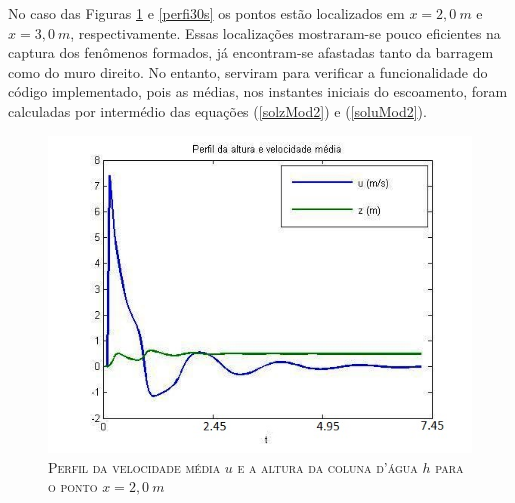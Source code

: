  No caso das Figuras \ref{perfi20s} e \ref{perfi30s} os pontos estão localizados em $x= 2,0 \ m$ e $x= 3,0 \ m$, respectivamente. Essas localizações mostraram-se pouco eficientes na captura dos fenômenos formados, já encontram-se afastadas tanto da barragem como do muro direito. No entanto, serviram para verificar a funcionalidade do código implementado, pois as médias, nos instantes iniciais do escoamento, foram calculadas por intermédio das equações (\ref{solzMod2}) e (\ref{soluMod2}).
 
 \begin{figure}[H]
 	\centering
 	\includegraphics[scale=1]{figuras/perfil20s.jpg}
 	\caption{\textsc{Perfil da velocidade média $u$ e a altura da coluna d'água $h$ para o ponto $x=2,0 \ m$}}
 	\vspace{-0.1cm}
 	\label{perfi20s}
 \end{figure}
 
